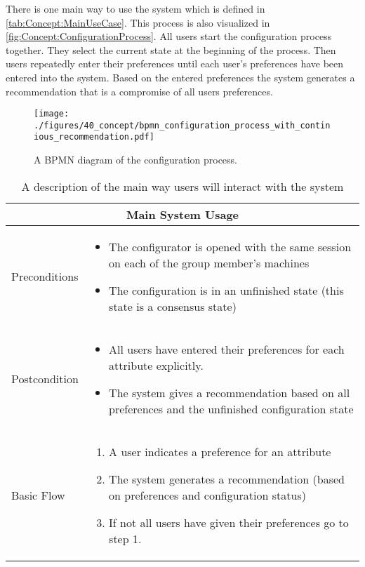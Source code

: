 There is one main way to use the system which is defined in \autoref{tab:Concept:MainUseCase}. This process is also visualized in \autoref{fig:Concept:ConfigurationProcess}. All users start the configuration process together.
They select the current state at the beginning of the process. Then users repeatedly enter their preferences until each user's preferences have been entered into the system. Based on the entered preferences the system generates a recommendation that is a compromise of all users preferences.

\begin{figure}
    \centering
    \texttt{[image: ./figures/40\_concept/bpmn\_configuration\_process\_with\_continious\_recommendation.pdf]}
    \caption{A BPMN diagram of the configuration process.}
    \label{fig:Concept:ConfigurationProcess}
\end{figure}

\begin{table}
    \begin{center}
        \begin{tabularx}{\columnwidth}{l|X}
            \multicolumn{2}{c}{Main System Usage} \\
            \hline
            Preconditions   & 
                \begin{itemize}
                    \item The configurator is opened with the same session on each of the group member's machines
                    \item The configuration is in an unfinished state (this state is a consensus state)
                \end{itemize} \\
            \hline
            Postcondition   & 
                \begin{itemize}
                    \item All users have entered their preferences for each attribute explicitly.
                    \item The system gives a recommendation based on all preferences and the unfinished configuration state
                \end{itemize} \\
            \hline
            Basic Flow      & 
                \begin{enumerate}
                    \item A user indicates a preference for an attribute
                    \item The system generates a recommendation (based on preferences and configuration status)
                    \item If not all users have given their preferences go to step 1.
                \end{enumerate} \\
            \hline
        \end{tabularx}
        \caption{A description of the main way users will interact with the system}
        \label{tab:Concept:MainUseCase}
    \end{center}
\end{table}

